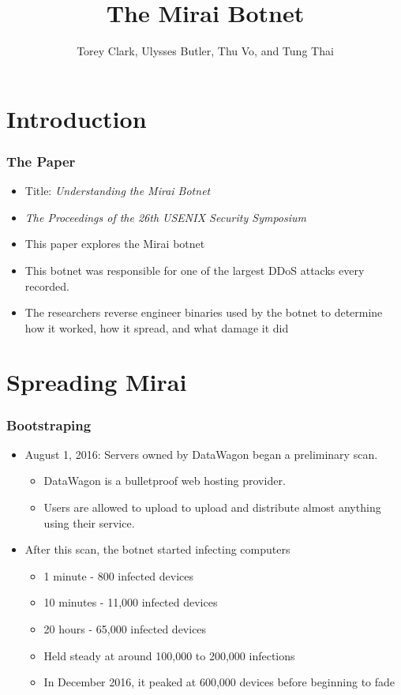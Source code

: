 \documentclass{beamer}
\title{The Mirai Botnet}
\author{Torey Clark, Ulysses Butler, Thu Vo, and Tung Thai}
\institute{ Truman State University \\ Binary Beasts }
\date{}
\begin{document}
\maketitle

\section{Introduction}

\begin{frame}
	\frametitle{The Paper}
	\begin{itemize}
		\item<+-> Title: \textit{Understanding the Mirai Botnet}
		\item<+-> \textit{The Proceedings of the 26th USENIX Security Symposium}
		\item<+-> This paper explores the Mirai botnet
		\item<+-> This botnet was responsible for one of the largest DDoS attacks every recorded.
		\item<+-> The researchers reverse engineer binaries used by the botnet to determine how it worked, how it spread, and what damage it did
	\end{itemize}
\end{frame}

\section{Spreading Mirai}

\begin{frame}
	\frametitle{Bootstraping}
	\begin{itemize}
		\item<+-> August 1, 2016: Servers owned by DataWagon began a preliminary scan.
		\begin{itemize}
			\item<+-> DataWagon is a bulletproof web hosting provider.
			\item<+-> Users are allowed to upload to upload and distribute almost anything using their service.
		\end{itemize}
		\item<+-> After this scan, the botnet started infecting computers
		\begin{itemize}
			\item<+-> 1 minute -  800 infected devices
			\item<+-> 10 minutes - 11,000 infected devices
			\item<+-> 20 hours - 65,000 infected devices
			\item<+-> Held steady at around 100,000 to 200,000 infections
			\item<+-> In December 2016, it peaked at 600,000 devices before beginning to fade
		\end{itemize}
	\end{itemize}
\end{frame}
\end{document}
